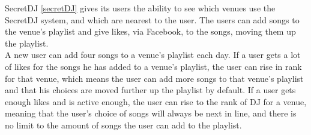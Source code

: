 SecretDJ \cref{secretDJ} gives its users the ability to see which venues use the SecretDJ system, and which are nearest to the user. The users can add songs to the venue's playlist and give likes, via Facebook, to the songs, moving them up the playlist.\\

A new user can add four songs to a venue's playlist each day. If a user gets a lot of likes for the songs he has added to a venue's playlist, the user can rise in rank for that venue, which means the user can add more songs to that venue's playlist and that his choices are moved further up the playlist by default. 
If a user gets enough likes and is active enough, the user can rise to the rank of DJ for a venue, meaning that the user's choice of songs will always be next in line, and there is no limit to the amount of songs the user can add to the playlist.
